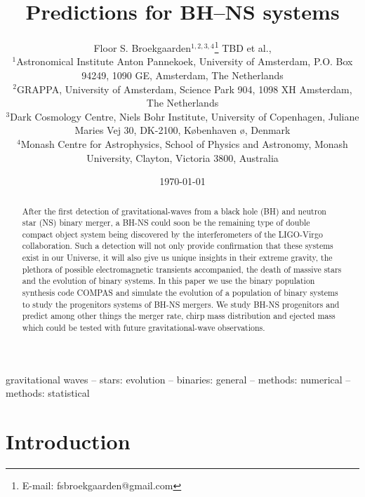 \documentclass[a4paper,fleqn,usenatbib,useAMS,usedcolumn]{mnras}
\title[]{Predictions for BH--NS systems}
\author[]
{Floor S. Broekgaarden$^{1,2,3,4}$\thanks{E-mail: fsbroekgaarden@gmail.com }
 TBD et al.,
\\
$^{1}$Astronomical Institute Anton Pannekoek, University of Amsterdam, P.O. Box 94249, 1090 GE, Amsterdam, The Netherlands \\
$^{2}$GRAPPA, University of Amsterdam, Science Park 904, 1098 XH Amsterdam, The
Netherlands \\
$^{3}$Dark Cosmology Centre, Niels Bohr Institute, University of
Copenhagen, Juliane Maries Vej 30, DK-2100, K\o benhaven \o, Denmark \\
$^{4}$Monash Centre for Astrophysics, School of Physics and Astronomy, Monash University, Clayton, Victoria 3800, Australia
}
\date{\today}
\begin{document}
\normalem

\label{firstpage}
\pagerange{\pageref{firstpage}--\pageref{lastpage}}
\maketitle

\begin{abstract}
After the first detection of gravitational-waves from a black hole (BH)  and  neutron star (NS) binary merger, a BH-NS  could soon be the remaining type of double compact object system being discovered by the  interferometers of the LIGO-Virgo collaboration. Such a detection will not only provide confirmation that these systems exist in our Universe, it will also give us unique insights in their extreme gravity,  the plethora of possible electromagnetic transients accompanied, the death of massive stars and the evolution of binary systems. In this paper we use the binary population synthesis code COMPAS and simulate  the evolution of a population of binary systems to study the progenitors systems of BH-NS mergers.    We study BH-NS progenitors and predict among other things the merger rate, chirp mass distribution and ejected mass which could be tested with future gravitational-wave observations.  
\end{abstract}


\begin{keywords}
gravitational waves --  stars: evolution -- binaries: general  -- methods: numerical -- methods: statistical 
\end{keywords}







\section{Introduction}
\label{sec:introduction}
%
\end{document}
